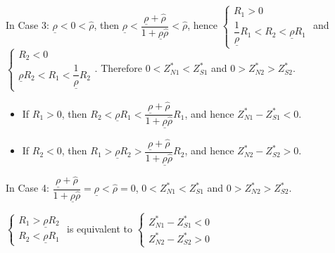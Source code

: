 \documentclass[10pt]{article}
\begin{document}
In Case 3: $ \underline{\rho} < 0 < {\hat \rho} $, then $ \underline{\rho} < \dfrac{\underline{\rho} + {\hat \rho}}{1 + \underline{\rho} {\hat \rho}} < {\hat \rho} $, hence $ \left\{ \begin{matrix} R_1 > 0 \\ \dfrac{1}{\underline{\rho}} R_1 < R_2 < \underline{\rho} R_1 \end{matrix} \right. $ and $ \left\{ \begin{matrix} R_2 < 0 \\ \underline{\rho} R_2 < R_1 < \dfrac{1}{\underline{\rho}} R_2 \end{matrix} \right. $.
Therefore $ 0 < Z_{N 1}^* < Z_{S 1}^* $ and $ 0 > Z_{N 2}^* > Z_{S 2}^* $.
\begin{itemize}
\item If $ R_1 > 0 $, then $ R_2 < \underline{\rho} R_1 < \dfrac{\underline{\rho} + {\hat \rho}}{1 + \underline{\rho} {\hat \rho}} R_1 $, and hence $ Z_{N 1}^* - Z_{S 1}^* < 0 $.
\item If $ R_2 < 0 $, then $ R_1 > \underline{\rho} R_2 > \dfrac{\underline{\rho} + {\hat \rho}}{1 + \underline{\rho} {\hat \rho}} R_2 $, and hence $ Z_{N 2}^* - Z_{S 2}^* > 0 $.
\end{itemize}

In Case 4: $ \dfrac{\underline{\rho} + {\hat \rho}}{1 + \underline{\rho} {\hat \rho}} = \underline{\rho} < {\hat \rho} = 0 $, $ 0 < Z_{N 1}^* < Z_{S 1}^* $ and $ 0 > Z_{N 2}^* > Z_{S 2}^* $.

$ \left\{ \begin{matrix} R_1 > \underline{\rho} R_2 \\ R_2 < \underline{\rho} R_1 \end{matrix} \right. $ is equivalent to $ \left\{ \begin{matrix} Z_{N 1}^* - Z_{S 1}^* < 0 \\ Z_{N 2}^* - Z_{S 2}^* > 0 \end{matrix} \right. $
\end{document}
